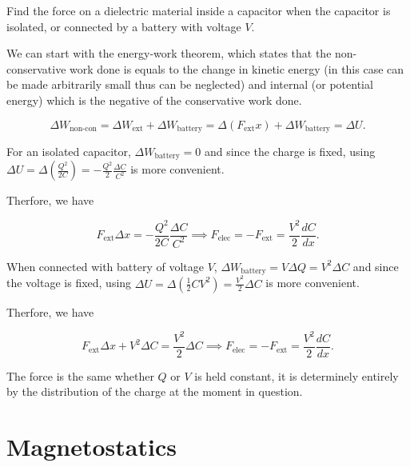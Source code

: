 \documentclass[english,a4paper,12pt]{report}
\begin{document}
{Find the force on a dielectric material inside a capacitor when the capacitor is isolated, or connected by a battery with voltage \(V\).}
{We can start with the energy-work theorem, which states that the non-conservative work done is equals to the change in kinetic energy (in this case can be made arbitrarily small thus can be neglected) and internal (or potential energy) which is the negative of the conservative work done.

\begin{equation}
    \Delta W_{\text{non-con} }  = \Delta W_{\text{ext} } + \Delta W_{\text{battery}} = \Delta \left( F_{\text{ext} } x \right) + \Delta W_{\text{battery} } = \Delta U.
\end{equation}

For an isolated capacitor, \(\Delta W_{\text{battery} } = 0 \) and since the charge is fixed, using \(\displaystyle \Delta U = \Delta \left( \frac{Q^2}{2C}  \right) = - \frac{Q^2}{2}\frac{\Delta C}{C^2}  \) is more convenient. 

Therfore, we have

\begin{equation}
    F_{\text{ext} }\Delta x = -\frac{Q^2}{2C}\frac{\Delta C}{C^2} \implies F_{\text{elec} } = - F_{\text{ext} } = \frac{V^2}{2}\frac{dC}{dx}.    
\end{equation}

When connected with battery of voltage \(V\), \(\Delta W_{\text{battery} } = V \Delta Q = V^2\Delta C\) and since the voltage is fixed, using \(\displaystyle \Delta U = \Delta \left( \frac{1}{2}CV^2  \right) = \frac{V^2}{2}\Delta C \) is more convenient.

Therfore, we have

\begin{equation}
    F_{\text{ext} } \Delta x + V^2\Delta C = \frac{V^2}{2}\Delta C \implies F_{\text{elec} } = -F_{\text{ext} } = \frac{V^2}{2}\frac{dC}{dx}.
\end{equation}

The force is the same whether \(Q \text { or } V\) is held constant, it is determinely entirely by the distribution of the charge at the moment in question.  
} 

\chapter{Magnetostatics}
\end{document}
